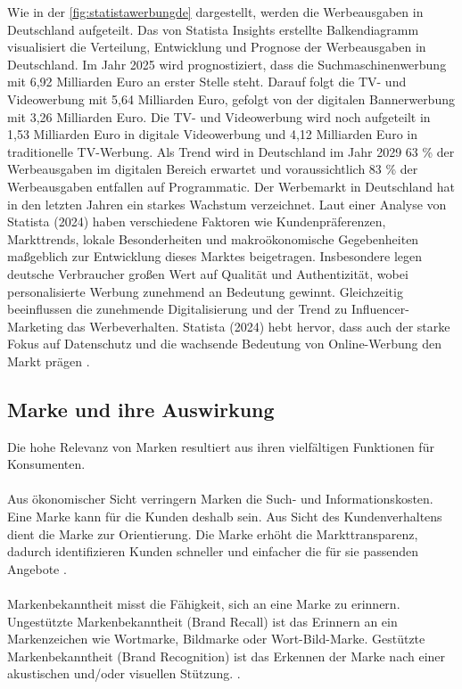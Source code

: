 Wie in der \autoref{fig:statistawerbungde} dargestellt, werden die Werbeausgaben in Deutschland aufgeteilt. Das von Statista Insights erstellte Balkendiagramm visualisiert die Verteilung, Entwicklung und Prognose der Werbeausgaben in Deutschland. Im Jahr 2025 wird prognostiziert, dass die Suchmaschinenwerbung mit 6,92 Milliarden Euro an erster Stelle steht. Darauf folgt die TV- und Videowerbung mit 5,64 Milliarden Euro, gefolgt von der digitalen Bannerwerbung mit 3,26 Milliarden Euro. Die TV- und Videowerbung wird noch aufgeteilt in 1,53 Milliarden Euro in digitale Videowerbung und 4,12 Milliarden Euro in traditionelle TV-Werbung. Als Trend wird in Deutschland im Jahr 2029 63 \% der Werbeausgaben im digitalen Bereich erwartet und voraussichtlich 83 \% der Werbeausgaben entfallen auf Programmatic. Der Werbemarkt in Deutschland hat in den letzten Jahren ein starkes Wachstum verzeichnet. Laut einer Analyse von Statista (2024) haben verschiedene Faktoren wie Kundenpräferenzen, Markttrends, lokale Besonderheiten und makroökonomische Gegebenheiten maßgeblich zur Entwicklung dieses Marktes beigetragen. Insbesondere legen deutsche Verbraucher großen Wert auf Qualität und Authentizität, wobei personalisierte Werbung zunehmend an Bedeutung gewinnt. Gleichzeitig beeinflussen die zunehmende Digitalisierung und der Trend zu Influencer-Marketing das Werbeverhalten. Statista (2024) hebt hervor, dass auch der starke Fokus auf Datenschutz und die wachsende Bedeutung von Online-Werbung den Markt prägen \cite{statista_werbung}.
\subsection{Marke und ihre Auswirkung}
\label{markenimage} 
Die hohe Relevanz von Marken resultiert aus ihren vielfältigen Funktionen für Konsumenten.\\\\
Aus ökonomischer Sicht verringern Marken die Such- und Informationskosten. Eine Marke kann für die Kunden deshalb  sein. Aus Sicht des Kundenverhaltens dient die Marke zur Orientierung. Die Marke erhöht die Markttransparenz, dadurch identifizieren Kunden schneller und einfacher die für sie passenden Angebote \cite[2]{burmann2024}. \\\\
Markenbekanntheit misst die Fähigkeit, sich an eine Marke zu erinnern. Ungestützte Markenbekanntheit (Brand Recall) ist das Erinnern an ein Markenzeichen wie Wortmarke, Bildmarke oder Wort-Bild-Marke. Gestützte Markenbekanntheit (Brand Recognition) ist das Erkennen der Marke nach einer akustischen und/oder visuellen Stützung. \cite[44]{burmann2024}. 

